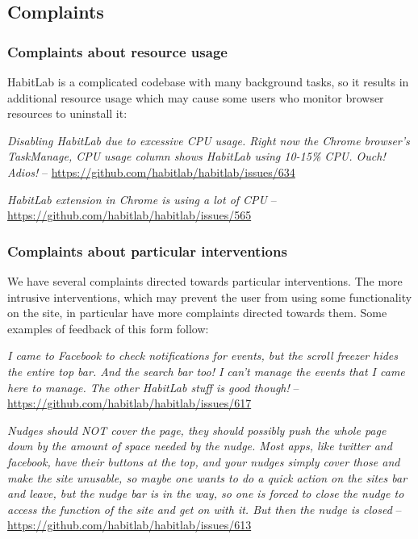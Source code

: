 \subsection{Complaints}

\subsubsection{Complaints about resource usage}

HabitLab is a complicated codebase with many background tasks, so it results in additional resource usage which may cause some users who monitor browser resources to uninstall it:

\textit{Disabling HabitLab due to excessive CPU usage. Right now the Chrome browser's TaskManage, CPU usage column shows HabitLab using 10-15\% CPU. Ouch! Adios!} -- \url{https://github.com/habitlab/habitlab/issues/634}

\textit{HabitLab extension in Chrome is using a lot of CPU} -- \url{https://github.com/habitlab/habitlab/issues/565}


\subsubsection{Complaints about particular interventions}

We have several complaints directed towards particular interventions. The more intrusive interventions, which may prevent the user from using some functionality on the site, in particular have more complaints directed towards them. Some examples of feedback of this form follow:

\textit{I came to Facebook to check notifications for events, but the scroll freezer hides the entire top bar. And the search bar too! I can't manage the events that I came here to manage. The other HabitLab stuff is good though!} -- \url{https://github.com/habitlab/habitlab/issues/617}

\textit{Nudges should NOT cover the page, they should possibly push the whole page down by the amount of space needed by the nudge. Most apps, like twitter and facebook, have their buttons at the top, and your nudges simply cover those and make the site unusable, so maybe one wants to do a quick action on the sites bar and leave, but the nudge bar is in the way, so one is forced to close the nudge to access the function of the site and get on with it. But then the nudge is closed} -- \url{https://github.com/habitlab/habitlab/issues/613}

